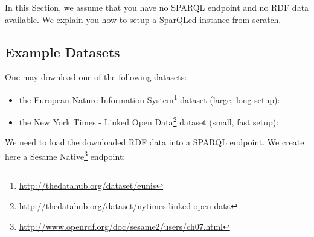 In this Section, we assume that you have no SPARQL endpoint and no RDF data available. We explain you how to setup a SparQLed instance from scratch.

\subsection{Example Datasets}

One may download one of the following datasets:
\begin{itemize}
    \item the European Nature Information System\footnote{\textcolor{blue}{\url{http://thedatahub.org/dataset/eunis}}} dataset (large, long setup):

    \begin{raggedleft}
    \end{raggedleft}

    \item the New York Times - Linked Open Data\footnote{\textcolor{blue}{\url{http://thedatahub.org/dataset/nytimes-linked-open-data}}} dataset (small, fast setup):

    \begin{raggedleft}
    \end{raggedleft}
\end{itemize}

We need to load the downloaded RDF data into a SPARQL endpoint.
We create here a Sesame Native\footnote{\textcolor{blue}{\url{http://www.openrdf.org/doc/sesame2/users/ch07.html}}} endpoint:

\bigskip
\begin{raggedleft}
\end{raggedleft}
\hfill

